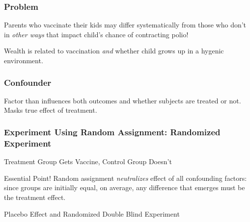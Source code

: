 \documentclass[handout]{beamer}
\begin{document}
\begin{frame}
\frametitle{Problem}
	Parents who vaccinate their kids may differ systematically from those who don't in \emph{other ways} that impact child's chance of contracting polio!
	
	\vspace{2em}
	\begin{alertblock}{Wealth is related to vaccination \emph{and} whether child grows up in a hygenic environment.}
	\end{alertblock}
\end{frame}
\begin{frame}
\frametitle{Confounder}

Factor than influences both outcomes and whether subjects are treated or not. Masks true effect of treatment.
\end{frame}


\begin{frame}

\frametitle{Experiment Using Random Assignment: Randomized Experiment}
Treatment Group Gets Vaccine, Control Group Doesn't

\begin{block}{Essential Point!}
Random assignment \emph{neutralizes} effect of all confounding factors: since groups are initially equal, on average, any difference that emerges must be the treatment effect.
\end{block}

\begin{block}{Placebo Effect and Randomized Double Blind Experiment}
\end{block}
\end{frame}
\end{document}

